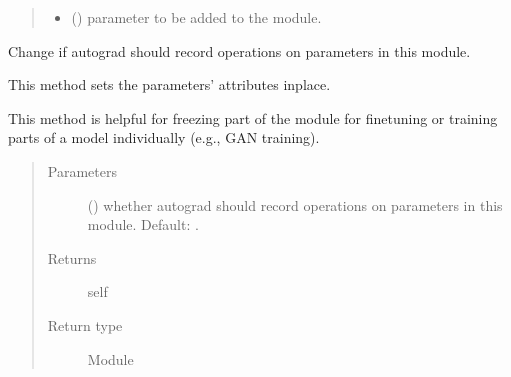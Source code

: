 \documentclass[letterpaper,10pt,english]{sphinxmanual}
\begin{document}
\begin{fulllineitems}
\begin{fulllineitems}
\begin{quote}
\begin{description}
\begin{itemize}
\item {} 
 () \textendash{} parameter to be added to the module.

\end{itemize}

\end{description}\end{quote}

\end{fulllineitems}


\begin{fulllineitems}
\label{\detokenize{api/autoencoding:geology.metamodelling.SpatialAutoencoder.requires_grad_}}
Change if autograd should record operations on parameters in this
module.

This method sets the parameters’  attributes
in\sphinxhyphen{}place.

This method is helpful for freezing part of the module for finetuning
or training parts of a model individually (e.g., GAN training).
\begin{quote}\begin{description}
\item[{Parameters}] \leavevmode
{} () \textendash{} whether autograd should record operations on
parameters in this module. Default: .

\item[{Returns}] \leavevmode
self

\item[{Return type}] \leavevmode
Module

\end{description}\end{quote}

\end{fulllineitems}



\end{fulllineitems}
\end{document}
